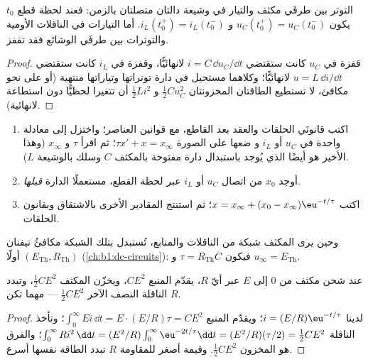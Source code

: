 \begin{proposition}\label{prop:b1:transient-regimes:continuity}
التوتر بين طرفَي مكثف والتيار في وشيعة دالتان
متصلتان بالزمن: فعند لحظة قطع $t_0$ يكون
$u_C(t_0^+) = u_C(t_0^-)$ و $i_L(t_0^+) = i_L(t_0^-)$. أما التيارات في
الناقلات الأومية والتوترات بين طرفَي الوشائع فقد تقفز.
\end{proposition}

\begin{proof}
قفزة في $u_C$ كانت ستقتضي $i = C\,\dd u_C/\dd t$ لانهائيًّا، وقفزة
في $i_L$ كانت ستقتضي $u = L\,\dd i/\dd t$ لانهائيًّا؛ وكلاهما
مستحيل في دارة توتراتها وتياراتها منتهية (أو على نحو مكافئ،
لا تستطيع الطاقتان المخزونتان $\tfrac12 Cu_C^2$ و $\tfrac12 Li^2$ أن تتغيرا
لحظيًّا دون استطاعة لانهائية).
\end{proof}

\begin{method}\label{met:b1:transient-regimes:first}
\begin{enumerate}
  \item اكتب قانونَي الحلقات والعقد بعد القاطع، مع
        قوانين العناصر؛ واختزل إلى معادلة واحدة في $u_C$ أو $i_L$ و
        ضعها على الصورة $\tau x' + x = x_\infty$؛ ثم اقرأ $\tau$ و
        $x_\infty$ (وهذا الأخير هو أيضًا  الذي يُوجد
        باستبدال دارة مفتوحة بالمكثف $C$ وسلك بالوشيعة $L$).
  \item أوجد $x_0$ من اتصال $u_C$ أو $i_L$ عبر
        لحظة القطع، مستعملًا الدارة \emph{قبلها}.
  \item اكتب $x = x_\infty + (x_0 - x_\infty)\eu^{-t/\tau}$؛ ثم استنتج
        المقادير الأخرى بالاشتقاق وبقانون الحلقات.
\end{enumerate}
وحين يرى المكثف شبكة من الناقلات والمنابع، تُستبدل
بتلك الشبكة مكافئُ تيفنان $(E_{\mathrm{Th}}, R_{\mathrm{Th}})$
أولًا (\cref{ch:b1:dc-circuits}): فيكون $\tau = R_{\mathrm{Th}}C$ و
$u_\infty = E_{\mathrm{Th}}$.
\end{method}

\begin{proposition}\label{prop:b1:transient-regimes:rcenergy}
عند شحن مكثف من $0$ إلى $E$ عبر أيّ  $R$، يقدّم
المنبع $CE^2$، ويخزّن المكثف $\tfrac12 CE^2$، وتبدد
الناقلة النصف الآخر $\tfrac12 CE^2$ --- مهما تكن $R$.
\end{proposition}

\begin{proof}
لدينا $i = (E/R)\eu^{-t/\tau}$؛ ويقدّم المنبع $\int_0^\infty Ei\,\dd t
= E \cdot (E/R)\tau = CE^2$؛ وتأخذ الناقلة $\int_0^\infty Ri^2\,\dd t
= (E^2/R)\int_0^\infty \eu^{-2t/\tau}\dd t = (E^2/R)(\tau/2) = \tfrac12 CE^2$؛
والفرق هو المخزون $\tfrac12 CE^2$. وقيمة أصغر للمقاومة $R$ تبدد
الطاقة نفسها أسرع.
\end{proof}

